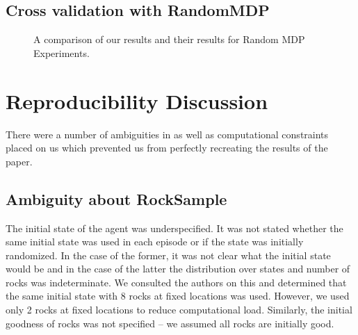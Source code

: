 \documentclass[11pt,twocolumn]{article}
\begin{document}
\subsection{Cross validation with RandomMDP}

\begin{figure}[h]
\centering
{}
\hspace{4mm}
\caption{A comparison of our results and their results for Random MDP Experiments.}
\end{figure}

\section{Reproducibility Discussion}
\label{sec: repDisc}

There were a number of ambiguities in \cite{jiang2015dependence} as well as computational constraints placed on us which prevented us from perfectly recreating the results of the paper. 

\subsection{Ambiguity about RockSample}
The initial state of the agent was underspecified. It was not stated whether the same initial state was used in each episode or if the state was initially randomized. In the case of the former, it was not clear what the initial state would be and in the case of the latter the distribution over states and number of rocks was indeterminate. We consulted the authors on this and determined that the same initial state with 8 rocks at fixed locations was used. However, we used only 2 rocks at fixed locations to reduce computational load. Similarly, the initial goodness of rocks was not specified -- we assumed all rocks are initially good.
\end{document}

